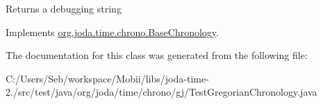 \begin{DoxyReturn}{Returns}
a debugging string 
\end{DoxyReturn}


Implements \hyperlink{classorg_1_1joda_1_1time_1_1chrono_1_1_base_chronology_a5b463f34fcc8d0093995564dafb81230}{org.\-joda.\-time.\-chrono.\-Base\-Chronology}.



The documentation for this class was generated from the following file\-:\begin{DoxyCompactItemize}
\item 
C\-:/\-Users/\-Seb/workspace/\-Mobii/libs/joda-\/time-\/2./src/test/java/org/joda/time/chrono/gj/Test\-Gregorian\-Chronology.\-java\end{DoxyCompactItemize}
